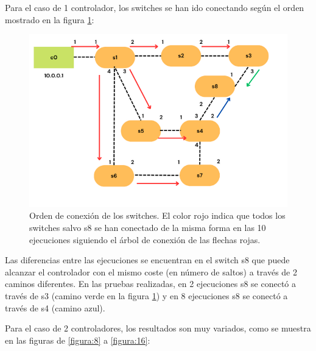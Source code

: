 \documentclass[a4paper, 12pt]{book}
\begin{document}
 	Para el caso de 1 controlador, los switches se han ido conectando según el orden mostrado en la figura \ref{figura:escenario1_1c_1}:
 	
 	\begin{figure}[H]
 		\centering
 		\includegraphics[width=16cm, keepaspectratio]{img/rutasEscenario1-1c}
 		\caption{Orden de conexión de los switches. El color rojo indica que todos los switches salvo s8 se han conectado de la misma forma en las 10 ejecuciones siguiendo el árbol de conexión de las flechas rojas.}
 		\label{figura:escenario1_1c_1}
 	\end{figure}
 	
 	Las diferencias entre las ejecuciones se encuentran en el switch s8 que puede alcanzar
 	el controlador con el mismo coste (en número de saltos) a través de 2 caminos diferentes.
 	En las pruebas realizadas, en 2 ejecuciones s8 se conectó a través de s3 (camino verde
 	en la figura \ref{figura:escenario1_1c_1})	y en 8 ejecuciones s8 se conectó a través de s4 (camino	azul).
 	
 	Para el caso de 2 controladores, los resultados son muy variados, como se muestra en las figuras de \ref{figura:8} a \ref{figura:16}:
 	
\end{document}
